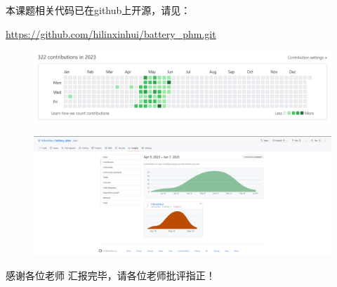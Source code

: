 \documentclass{beamer}
\begin{document}
\begin{frame}
	\centering
	本课题相关代码已在github上开源，请见：

	\centering
	\url {https://github.com/hilinxinhui/battery_phm.git}

	\begin{figure}[htbp]
		\centering
		\includegraphics[scale=0.35]{figures/github_contribution_log.png}
	\end{figure}

	\begin{figure}[htbp]
		\centering
		\includegraphics[scale=0.15]{figures/github_contribution_log_2.png}
	\end{figure}

\end{frame}

\begin{frame}{感谢各位老师}
	\LARGE \centering 汇报完毕，请各位老师批评指正！
\end{frame}
\end{document}
